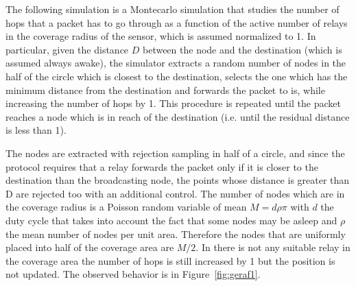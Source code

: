 \documentclass[10pt]{article}
\begin{document}
The following simulation is a Montecarlo simulation that studies the number of hops that a packet has to go through as a function of the active number of relays in the coverage radius of the sensor, which is assumed normalized to 1. In particular, given the distance $D$ between the node and the destination (which is assumed always awake), the simulator extracts a random number of nodes in the half of the circle which is closest to the destination, selects the one which has the minimum distance from the destination and forwards the packet to is, while increasing the number of hops by 1. This procedure is repeated until the packet reaches a node which is in reach of the destination (i.e. until the residual distance is less than 1). 

The nodes are extracted with rejection sampling in half of a circle, and since the protocol requires that a relay forwards the packet only if it is closer to the destination than the broadcasting node, the points whose distance is greater than D are rejected too with an additional control. The number of nodes which are in the coverage radius is a Poisson random variable of mean $M = d \rho \pi$ with $d$ the duty cycle that takes into account the fact that some nodes may be asleep and $\rho$ the mean number of nodes per unit area. Therefore the nodes that are uniformly placed into half of the coverage area are $M/2$. In there is not any suitable relay in the coverage area the number of hops is still increased by 1 but the position is not updated. The observed behavior is in Figure~\ref{fig:geraf1}.
\end{document}
